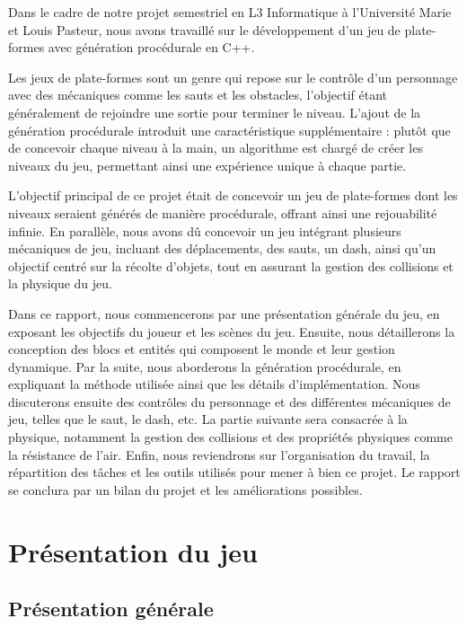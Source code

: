 \documentclass[10pt]{report}
\begin{document}
Dans le cadre de notre projet semestriel en L3 Informatique à l'Université Marie et Louis Pasteur,
nous avons travaillé sur le développement d’un jeu de plate-formes avec génération procédurale en C++.

Les jeux de plate-formes sont un genre qui repose sur le contrôle d'un personnage avec des mécaniques comme
les sauts et les obstacles, l’objectif étant généralement de rejoindre une sortie pour terminer le niveau.
L’ajout de la génération procédurale introduit une caractéristique supplémentaire :
plutôt que de concevoir chaque niveau à la main, un algorithme est chargé de créer les niveaux du jeu,
permettant ainsi une expérience unique à chaque partie.

L'objectif principal de ce projet était de concevoir un jeu de plate-formes dont les niveaux seraient générés
de manière procédurale, offrant ainsi une rejouabilité infinie.
En parallèle, nous avons dû concevoir un jeu intégrant plusieurs mécaniques de jeu, incluant des déplacements,
des sauts, un dash, ainsi qu’un objectif centré sur la récolte d’objets,
tout en assurant la gestion des collisions et la physique du jeu.

Dans ce rapport, nous commencerons par une présentation générale du jeu, en exposant les objectifs du joueur et
les scènes du jeu.
Ensuite, nous détaillerons la conception des blocs et entités qui composent le monde et leur gestion dynamique.
Par la suite, nous aborderons la génération procédurale, en expliquant la méthode utilisée ainsi que les détails
d'implémentation.
Nous discuterons ensuite des contrôles du personnage et des différentes mécaniques de jeu, telles que le saut,
le dash, etc.
La partie suivante sera consacrée à la physique, notamment la gestion des collisions et des propriétés physiques
comme la résistance de l'air.
Enfin, nous reviendrons sur l’organisation du travail, la répartition des tâches et les outils utilisés pour
mener à bien ce projet.
Le rapport se conclura par un bilan du projet et les améliorations possibles.

\pagebreak



\section{Présentation du jeu}
\subsection{Présentation générale}
\end{document}
